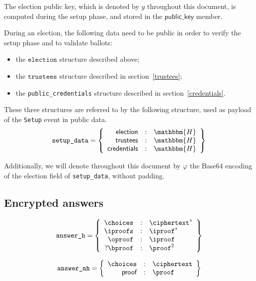 \documentclass[a4paper]{article}
\newcommand{\hash}{\mathbbm{H}}
\newcommand{\election}{\texttt{election}}
\begin{document}
The election public key, which is denoted by $y$ throughout this
document, is computed during the setup phase, and stored in the
$\textsf{public\_key}$ member.

During an election, the following data need to be public in order to
verify the setup phase and to validate ballots:
\begin{itemize}
\item the $\election$ structure described above;
\item the $\texttt{trustees}$ structure described in
  section~\ref{trustees};
\item the \texttt{public\_credentials} structure described in
  section~\ref{credentials}.
\end{itemize}
These three structures are referred to by the following structure, used
as payload of the \texttt{Setup} event in public data.
\begin{gather*}
  \texttt{setup\_data}=\left\{
    \begin{array}{rcl}
      \textsf{election}&:&\hash\\
      \textsf{trustees}&:&\hash\\
      \textsf{credentials}&:&\hash
    \end{array}
  \right\}
\end{gather*}

\label{varphi}
Additionally, we will denote throughout this document by $\varphi$ the
Base64 encoding of the \textsf{election} field of
\texttt{setup\_data}, without padding.

\subsection{Encrypted answers}
\label{answers}

\begin{gather*}
  \texttt{answer\_h}=\left\{
    \begin{array}{rcl}
      \choices&:&\ciphertext^\ast\\
      \iproofs&:&\iproof^\ast\\
      \oproof&:&\iproof\\
      ?\bproof&:&\proof^2
    \end{array}
  \right\}
\end{gather*}

\begin{gather*}
  \texttt{answer\_nh}=\left\{
    \begin{array}{rcl}
      \choices&:&\ciphertext\\
      \textsf{proof}&:&\proof
    \end{array}
  \right\}
\end{gather*}
\end{document}

